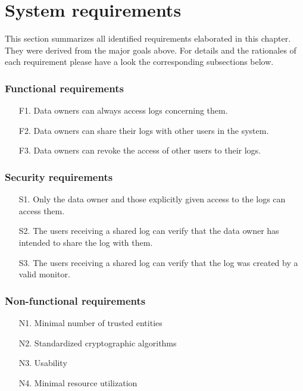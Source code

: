 \documentclass[../main.tex]{subfiles}
\begin{document}
\section{System requirements}\label{system-requriements}
This section summarizes all identified requirements elaborated in this chapter.
They were derived from the major goals above.
For details and the rationales of each requirement please have a look the corresponding subsections below.

\subsubsection{Functional requirements}
\begin{itemize}
    \item [F1.] Data owners can always access logs concerning them.
    \item [F2.] Data owners can share their logs with other users in the system.
    \item [F3.] Data owners can revoke the access of other users to their logs.
\end{itemize}

\subsubsection{Security requirements}
\begin{itemize}
    \item [S1.] Only the data owner and those explicitly given access to the logs can access them.
    \item [S2.] The users receiving a shared log can verify that the data owner has intended to share the log with them.
    \item [S3.] The users receiving a shared log can verify that the log was created by a valid monitor.
\end{itemize}

\subsubsection{Non-functional requirements}
\begin{itemize}
    \item [N1.] Minimal number of trusted entities
    \item [N2.] Standardized cryptographic algorithms
    \item [N3.] Usability
    \item [N4.] Minimal resource utilization
\end{itemize}
\end{document}
